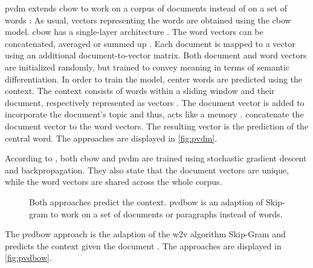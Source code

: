 \ac{pvdm} extends \ac{cbow} to work on a corpus of documents instead of on a set of words \cite{clusteringDocs2020}:
As usual, vectors representing the words are obtained using the \ac{cbow} model.
\ac{cbow} has a single-layer architecture \cite{glove2014}. %
The word vectors can be concatenated, averaged or summed up \cite{SentRep2014}.
Each document is mapped to a vector using an additional document-to-vector matrix.
Both document and word vectors are initialized randomly, but trained to convey meaning in terms of semantic differentiation.
In order to train the model, center words are predicted using the context.
The context consists of words within a sliding window and their document, respectively represented as vectors \cite{SentRep2014}.
The document vector is added to incorporate the document's topic and thus, acts like a memory \cite{SentRep2014, Top2Vec2020}.
\citeauthor{SentRep2014} concatenate the document vector to the word vectors.
The resulting vector is the prediction of the central word.
The approaches are displayed in \autoref{fig:pvdm}.

According to \citeauthor{SentRep2014}, both \ac{cbow} and \ac{pvdm} are trained using stochastic gradient descent and backpropagation.
They also state that the document vectors are unique, while the word vectors are shared across the whole corpus. 

\begin{figure}%
    \centering
    \qquad
    \caption[Two \ac{pvdbow} architectures]{Both approaches predict the context.
    \ac{pvdbow} is an adaption of Skip-gram to work on a set of documents or paragraphs instead of words.
    }%
    \label{fig:pvdbow}%
\end{figure}
The \ac{pvdbow} approach is the adaption of the \ac{w2v} algorithm Skip-Gram and predicts the context 
given the document \cite{SentRep2014}.
The approaches are displayed in \autoref{fig:pvdbow}.


